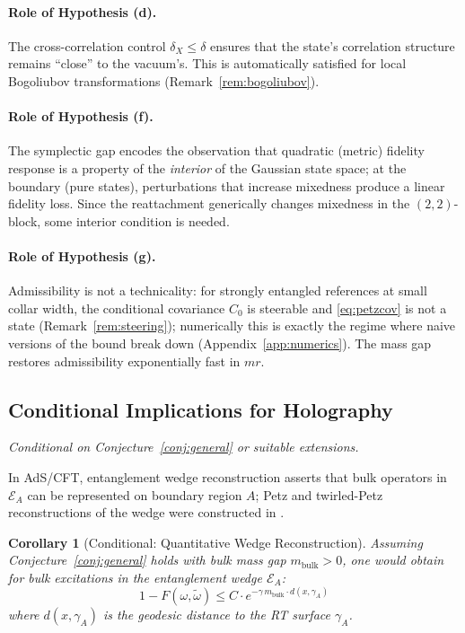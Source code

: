 \documentclass[11pt,a4paper]{article}
\theoremstyle{plain}
\newtheorem{corollary}[theorem]{Corollary}
\theoremstyle{definition}
\theoremstyle{remark}
\begin{document}
\paragraph{Role of Hypothesis (d).} The cross-correlation control
$\delta_X \le \delta$ ensures that the state's correlation structure remains
``close'' to the vacuum's. This is automatically satisfied for local Bogoliubov
transformations (Remark~\ref{rem:bogoliubov}).

\paragraph{Role of Hypothesis (f).} The symplectic gap encodes the observation
that quadratic (metric) fidelity response is a property of the \emph{interior} of
the Gaussian state space; at the boundary (pure states), perturbations that
increase mixedness produce a linear fidelity loss. Since the reattachment
generically changes mixedness in the $(2,2)$-block, some interior condition is
needed.

\paragraph{Role of Hypothesis (g).} Admissibility is not a technicality: for
strongly entangled references at small collar width, the conditional covariance
$C_0$ is steerable and \eqref{eq:petzcov} is not a state
(Remark~\ref{rem:steering}); numerically this is exactly the regime where naive
versions of the bound break down (Appendix~\ref{app:numerics}). The mass gap
restores admissibility exponentially fast in $mr$.

\subsection{Conditional Implications for Holography}

\emph{Conditional on Conjecture~\ref{conj:general} or suitable extensions.}

In AdS/CFT, entanglement wedge reconstruction \cite{DongHW16,JLMS16} asserts that
bulk operators in $\mathcal{E}_A$ can be represented on boundary region $A$; Petz
and twirled-Petz reconstructions of the wedge were constructed in
\cite{CotlerEtAl19,ChenPS20}.

\begin{corollary}[Conditional: Quantitative Wedge Reconstruction]\label{cor:wedge}
Assuming Conjecture~\ref{conj:general} holds with bulk mass gap
$m_{\mathrm{bulk}} > 0$, one would obtain for bulk excitations in the entanglement
wedge $\mathcal{E}_A$:
\begin{equation}
1 - F(\omega, \tilde{\omega}) \le
C \cdot e^{-\gamma\, m_{\mathrm{bulk}} \cdot d(x, \gamma_A)}
\end{equation}
where $d(x, \gamma_A)$ is the geodesic distance to the RT surface $\gamma_A$.
\end{corollary}
\end{document}
